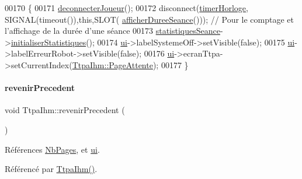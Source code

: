 \begin{DoxyCode}
00170 \{
00171     \hyperlink{class_ttpa_ihm_a86d400f2f250f5d2984c8c36394c2ac2}{deconnecterJoueur}();
00172     disconnect(\hyperlink{class_ttpa_ihm_a447ad7262efa01d22bc3222e0e470087}{timerHorloge}, SIGNAL(timeout()),\textcolor{keyword}{this},SLOT(
      \hyperlink{class_ttpa_ihm_a266897eb263e584b40fc2b7c26347623}{afficherDureeSeance}())); \textcolor{comment}{// Pour le comptage et l'affichage de la durée d'une séance}
00173     \hyperlink{class_ttpa_ihm_abed6897d6f7b4d3a5eb8dcc07651e740}{statistiquesSeance}->\hyperlink{class_statistiques_seance_a17e1c49e2986a8490ff96e4bd7733291}{initialiserStatistiques}();
00174     \hyperlink{class_ttpa_ihm_ad5fae1222a667da158c26f3d0f0dce23}{ui}->labelSystemeOff->setVisible(\textcolor{keyword}{false});
00175     \hyperlink{class_ttpa_ihm_ad5fae1222a667da158c26f3d0f0dce23}{ui}->labelErreurRobot->setVisible(\textcolor{keyword}{false});
00176     \hyperlink{class_ttpa_ihm_ad5fae1222a667da158c26f3d0f0dce23}{ui}->ecranTtpa->setCurrentIndex(\hyperlink{class_ttpa_ihm_aad886f2c7b90b4f990492092f0be9c2ba94101700630d213692269ca864ff87fe}{TtpaIhm::PageAttente});
00177 \}
\end{DoxyCode}
\mbox{\label{class_ttpa_ihm_a92bcffa9388cff7b55a52ae36e5d120d}} 
\paragraph{\texorpdfstring{revenir\+Precedent}{revenirPrecedent}}
{\footnotesize\ttfamily void Ttpa\+Ihm\+::revenir\+Precedent (\begin{DoxyParamCaption}{ }\end{DoxyParamCaption})\hspace{0.3cm}{\ttfamily [slot]}}



Références \hyperlink{class_ttpa_ihm_aad886f2c7b90b4f990492092f0be9c2ba66041bd2f2e100691c4d94c918e92956}{Nb\+Pages}, et \hyperlink{class_ttpa_ihm_ad5fae1222a667da158c26f3d0f0dce23}{ui}.



Référencé par \hyperlink{class_ttpa_ihm_ab3ed4b37a93ff04842414d4a98861d66}{Ttpa\+Ihm()}.


